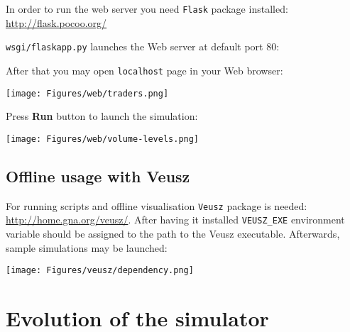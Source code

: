 \documentclass[a4paper,11pt]{article}
\begin{document}
In order to run the web server you need \texttt{Flask} package
installed: \url{http://flask.pocoo.org/}

\texttt{wsgi/flaskapp.py} launches the Web server at default port 80:

After that you may open \texttt{localhost} page in your Web browser:

\centerline{\texttt{[image: Figures/web/traders.png]}}

Press \textbf{Run} button to launch the simulation:

\centerline{\texttt{[image: Figures/web/volume-levels.png]}}

\subsection{Offline usage with Veusz}\label{offline-usage-with-veusz}

For running scripts and offline visualisation \texttt{Veusz} package is
needed: \url{http://home.gna.org/veusz/}. After having it installed
\texttt{VEUSZ\_EXE} environment variable should be assigned to the path
to the Veusz executable. Afterwards, sample simulations may be launched:

\centerline{\texttt{[image: Figures/veusz/dependency.png]}}

\section{Evolution of the simulator}\label{evolution-of-the-simulator}
\end{document}
